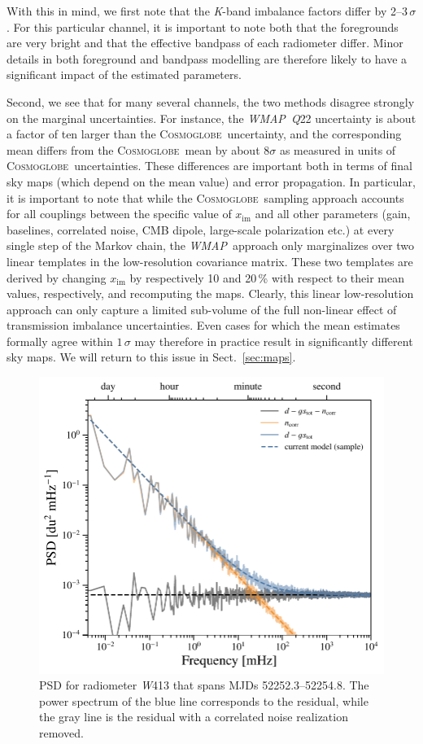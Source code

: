 \documentclass[twocolumn]{../../common/aa}
\def\WMAP{\emph{WMAP}}
\newcommand{\cosmoglobe}{\textsc{Cosmoglobe}}
\newcommand{\K}[0]{\textit K}
\newcommand{\Q}[0]{\textit Q}
\newcommand{\W}[0]{\textit W}
\begin{document}
With this in mind, we first note that the \K-band imbalance factors differ by 2--3\,$\sigma$. For this particular channel, it is important to note both that the foregrounds are very bright and that the effective bandpass of each radiometer differ. Minor details in both foreground and bandpass modelling are therefore likely to have a significant impact of the estimated parameters. 

Second, we see that for many several channels, the two methods disagree strongly on the marginal uncertainties. For instance, the \WMAP\ \Q22 uncertainty is about a factor of ten larger than the \cosmoglobe\ uncertainty, and the corresponding mean differs from the \cosmoglobe\ mean by about $8\sigma$ as measured in units of \cosmoglobe\ uncertainties. These differences are important both in terms of final sky maps (which depend on the mean value) and error propagation. In particular, it is important to note that while the \cosmoglobe\ sampling approach accounts for all couplings between the specific value of $x_{\mathrm{im}}$ and all other parameters (gain, baselines, correlated noise, CMB dipole, large-scale polarization etc.) at every single step of the Markov chain, the \WMAP\ approach only marginalizes over two linear templates in the low-resolution covariance matrix. These two templates are derived by changing $x_{\mathrm{im}}$ by respectively 10 and 20\,\% with respect to their mean values, respectively, and recomputing the maps. Clearly, this linear low-resolution approach can only capture a limited sub-volume of the full non-linear effect of transmission imbalance uncertainties. Even cases for which the mean estimates formally agree within $1\,\sigma$ may therefore in practice result in significantly different sky maps. We will return to this issue in Sect.~\ref{sec:maps}. 

\begin{figure}
	\includegraphics[width=\columnwidth]{figures/ps_test_W4_det1.pdf}
	\caption{PSD for radiometer \W413 that spans MJDs 52252.3--52254.8. The power spectrum of the blue line corresponds to the residual, while the gray line is the residual with a correlated noise realization removed.}
	\label{fig:W413_psd}
\end{figure}
\end{document}

